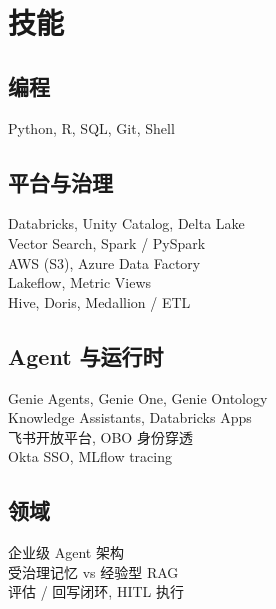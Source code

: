 \documentclass[letterpaper]{deedy-resume}
\begin{document}



\begin{minipage}[t]{0.33\textwidth}

\section{技能}
\vspace{1mm}

\subsection{编程}
Python, R, SQL, Git, Shell

\sectionspace

\subsection{平台与治理}
Databricks, Unity Catalog, Delta Lake \\
Vector Search, Spark / PySpark \\
AWS (S3), Azure Data Factory \\
Lakeflow, Metric Views \\
Hive, Doris, Medallion / ETL

\sectionspace

\subsection{Agent 与运行时}
Genie Agents, Genie One, Genie Ontology \\
Knowledge Assistants, Databricks Apps \\
飞书开放平台, OBO 身份穿透 \\
Okta SSO, MLflow tracing

\sectionspace

\subsection{领域}
企业级 Agent 架构 \\
受治理记忆 vs 经验型 RAG \\
评估 / 回写闭环, HITL 执行


\end{minipage}
\end{document}
